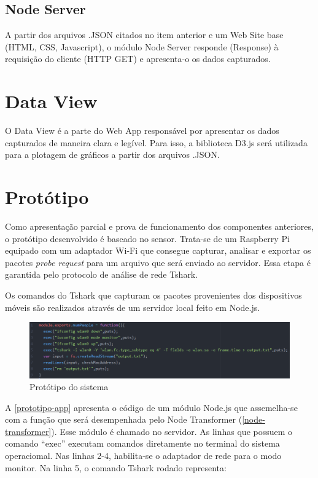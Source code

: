 \subsection{Node Server}
 A partir dos arquivos .JSON citados no item anterior e um Web Site base (HTML,
 CSS, Javascript), o módulo Node Server responde (Response) à requisição do
 cliente (HTTP GET) e apresenta-o os dados capturados.

\section{Data View}
O Data View é a parte do Web App responsável por apresentar os dados capturados
de maneira clara e legível. Para isso, a biblioteca D3.js \cite{D32017} será
utilizada para a plotagem de gráficos a partir dos arquivos .JSON.

\section{Protótipo}
Como apresentação parcial e prova de funcionamento dos componentes anteriores, o protótipo desenvolvido é baseado no sensor.
Trata-se de um Raspberry Pi equipado com um adaptador Wi-Fi que consegue capturar, analisar e exportar os pacotes
\emph{probe request} para um arquivo que será enviado ao servidor. Essa etapa é garantida pelo protocolo de análise de rede
Tshark.

Os comandos do Tshark que capturam os pacotes provenientes dos dispositivos móveis são realizados através de um servidor local
feito em Node.js.

\begin{figure}[!h]
  \caption{\label{prototipo-app}Protótipo do sistema}
  \begin{center}
    \includegraphics[width=1.0\textwidth]{img/prototipo-app.png}
  \end{center}
\end{figure}

A \autoref{prototipo-app} apresenta o código de um módulo Node.js que
assemelha-se com a função que será desempenhada pelo Node Transformer
(\autoref{node-transformer}). Esse módulo é chamado no servidor. As linhas que
possuem o comando ``exec'' executam comandos diretamente no terminal do sistema
operaciomal. Nas linhas 2-4, habilita-se o adaptador de rede para o modo
monitor. Na linha 5, o comando Tshark rodado representa:


